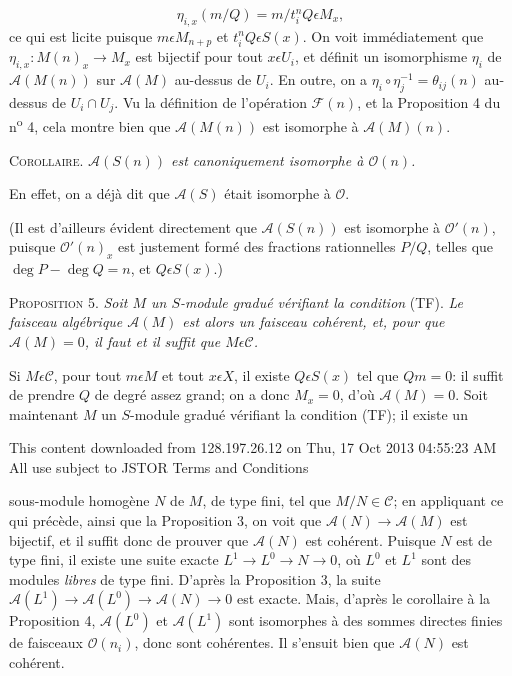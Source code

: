 \begin{equation*}
\eta_{i,x}(m/Q) = m/t_i^n Q \epsilon M_x ,
\end{equation*}
ce qui est licite puisque $m \epsilon M_{n+p}$ et $t_i^n Q \epsilon S(x)$. On voit immédiatement que $\eta_{i,x} : M(n)_x \to M_x$ est bijectif pour tout $x \epsilon U_i$, et définit un isomorphisme $\eta_i$ de $\mathcal{A}(M(n))$ sur $\mathcal{A}(M)$ au-dessus de $U_i$. En outre, on a $\eta_i \circ \eta_j^{-1} = \theta_{ij}(n)$ au-dessus de $U_i \cap U_j$. Vu la définition de l'opération $\mathcal{F}(n)$, et la Proposition 4 du n\textsuperscript{o} 4, cela montre bien que $\mathcal{A}(M(n))$ est isomorphe à $\mathcal{A}(M)(n)$.

\textsc{Corollaire}. \textit{$\mathcal{A}(S(n))$ est canoniquement isomorphe à $\mathcal{O}(n)$.}

En effet, on a déjà dit que $\mathcal{A}(S)$ était isomorphe à $\mathcal{O}$.

(Il est d'ailleurs évident directement que $\mathcal{A}(S(n))$ est isomorphe à $\mathcal{O}'(n)$, puisque $\mathcal{O}'(n)_x$ est justement formé des fractions rationnelles $P/Q$, telles que $\deg P - \deg Q = n$, et $Q \epsilon S(x)$.)

\textsc{Proposition} 5. \textit{Soit $M$ un $S$-module gradué vérifiant la condition} (TF). \textit{Le faisceau algébrique $\mathcal{A}(M)$ est alors un faisceau cohérent, et, pour que $\mathcal{A}(M) = 0$, il faut et il suffit que $M \epsilon \mathcal{C}$.}

Si $M \epsilon \mathcal{C}$, pour tout $m \epsilon M$ et tout $x \epsilon X$, il existe $Q \epsilon S(x)$ tel que $Qm = 0$: il suffit de prendre $Q$ de degré assez grand; on a donc $M_x = 0$, d'où $\mathcal{A}(M) = 0$. Soit maintenant $M$ un $S$-module gradué vérifiant la condition (TF); il existe un 

This content downloaded from 128.197.26.12 on Thu, 17 Oct 2013 04:55:23 AM\\All use subject to JSTOR Terms and Conditions



 sous-module homogène $N$ de $M$, de type fini, tel que $M/N \in \mathcal{C}$; en appliquant ce qui précède, ainsi que la Proposition 3, on voit que $\mathcal{A}(N) \to \mathcal{A}(M)$ est bijectif, et il suffit donc de prouver que $\mathcal{A}(N)$ est cohérent. Puisque $N$ est de type fini, il existe une suite exacte $L^{1} \to L^{0} \to N \to 0$, où $L^{0}$ et $L^{1}$ sont des modules \textit{libres} de type fini. D'après la Proposition 3, la suite $\mathcal{A}(L^{1}) \to \mathcal{A}(L^{0}) \to \mathcal{A}(N) \to 0$ est exacte. Mais, d'après le corollaire à la Proposition 4, $\mathcal{A}(L^{0})$ et $\mathcal{A}(L^{1})$ sont isomorphes à des sommes directes finies de faisceaux $\mathcal{O}(n_{i})$, donc sont cohérentes. Il s'ensuit bien que $\mathcal{A}(N)$ est cohérent.

